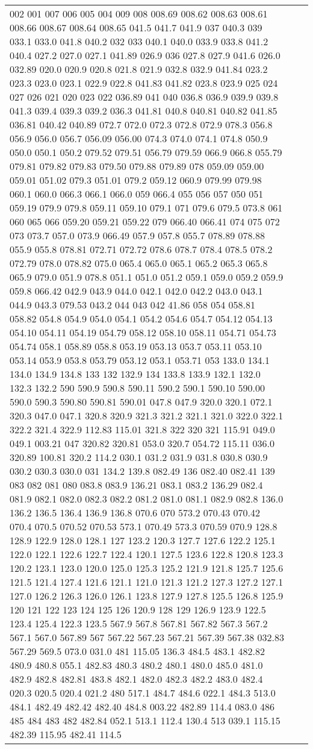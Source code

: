 \begin{longtable}{|R{.05in}|L{.65in}||L{5.65in}|}
002 001 007 006 005 004 009 008 008.69 008.62 008.63 008.61 008.66 008.67 008.64 008.65 041.5 041.7 041.9 037 040.3 039 033.1 033.0 041.8 040.2 032 033 040.1 040.0 033.9 033.8 041.2 040.4 027.2 027.0 027.1 041.89 026.9 036 027.8 027.9 041.6 026.0 032.89 020.0 020.9 020.8 021.8 021.9 032.8 032.9 041.84 023.2 023.3 023.0 023.1 022.9 022.8 041.83 041.82 023.8 023.9 025 024 027 026 021 020 023 022 036.89 041 040 036.8 036.9 039.9 039.8 041.3 039.4 039.3 039.2 036.3 041.81 040.8 040.81 040.82 041.85 036.81 040.42 040.89 072.7 072.0 072.3 072.8 072.9 078.3 056.8 056.9 056.0 056.7 056.09 056.00 074.3 074.0 074.1 074.8 050.9 050.0 050.1 050.2 079.52 079.51 056.79 079.59 066.9 066.8 055.79 079.81 079.82 079.83 079.50 079.88 079.89 078 059.09 059.00 059.01 051.02 079.3 051.01 079.2 059.12 060.9 079.99 079.98 060.1 060.0 066.3 066.1 066.0 059 066.4 055 056 057 050 051 059.19 079.9 079.8 059.11 059.10 079.1 071 079.6 079.5 073.8 061 060 065 066 059.20 059.21 059.22 079 066.40 066.41 074 075 072 073 073.7 057.0 073.9 066.49 057.9 057.8 055.7 078.89 078.88 055.9 055.8 078.81 072.71 072.72 078.6 078.7 078.4 078.5 078.2 072.79 078.0 078.82 075.0 065.4 065.0 065.1 065.2 065.3 065.8 065.9 079.0 051.9 078.8 051.1 051.0 051.2 059.1 059.0 059.2 059.9 059.8 066.42 042.9 043.9 044.0 042.1 042.0 042.2 043.0 043.1 044.9 043.3 079.53 043.2 044 043 042 41.86 058 054 058.81 058.82 054.8 054.9 054.0 054.1 054.2 054.6 054.7 054.12 054.13 054.10 054.11 054.19 054.79 058.12 058.10 058.11 054.71 054.73 054.74 058.1 058.89 058.8 053.19 053.13 053.7 053.11 053.10 053.14 053.9 053.8 053.79 053.12 053.1 053.71 053 133.0 134.1 134.0 134.9 134.8 133 132 132.9 134 133.8 133.9 132.1 132.0 132.3 132.2 590 590.9 590.8 590.11 590.2 590.1 590.10 590.00 590.0 590.3 590.80 590.81 590.01 047.8 047.9 320.0 320.1 072.1 320.3 047.0 047.1 320.8 320.9 321.3 321.2 321.1 321.0 322.0 322.1 322.2 321.4 322.9 112.83 115.01 321.8 322 320 321 115.91 049.0 049.1 003.21 047 320.82 320.81 053.0 320.7 054.72 115.11 036.0 320.89 100.81 320.2 114.2 030.1 031.2 031.9 031.8 030.8 030.9 030.2 030.3 030.0 031 134.2 139.8 082.49 136 082.40 082.41 139 083 082 081 080 083.8 083.9 136.21 083.1 083.2 136.29 082.4 081.9 082.1 082.0 082.3 082.2 081.2 081.0 081.1 082.9 082.8 136.0 136.2 136.5 136.4 136.9 136.8 070.6 070 573.2 070.43 070.42 070.4 070.5 070.52 070.53 573.1 070.49 573.3 070.59 070.9 128.8 128.9 122.9 128.0 128.1 127 123.2 120.3 127.7 127.6 122.2 125.1 122.0 122.1 122.6 122.7 122.4 120.1 127.5 123.6 122.8 120.8 123.3 120.2 123.1 123.0 120.0 125.0 125.3 125.2 121.9 121.8 125.7 125.6 121.5 121.4 127.4 121.6 121.1 121.0 121.3 121.2 127.3 127.2 127.1 127.0 126.2 126.3 126.0 126.1 123.8 127.9 127.8 125.5 126.8 125.9 120 121 122 123 124 125 126 120.9 128 129 126.9 123.9 122.5 123.4 125.4 122.3 123.5 567.9 567.8 567.81 567.82 567.3 567.2 567.1 567.0 567.89 567 567.22 567.23 567.21 567.39 567.38 032.83 567.29 569.5 073.0 031.0 481 115.05 136.3 484.5 483.1 482.82 480.9 480.8 055.1 482.83 480.3 480.2 480.1 480.0 485.0 481.0 482.9 482.8 482.81 483.8 482.1 482.0 482.3 482.2 483.0 482.4 020.3 020.5 020.4 021.2 480 517.1 484.7 484.6 022.1 484.3 513.0 484.1 482.49 482.42 482.40 484.8 003.22 482.89 114.4 083.0 486 485 484 483 482 482.84 052.1 513.1 112.4 130.4 513 039.1 115.15 482.39 115.95 482.41 114.5 
\end{longtable}
